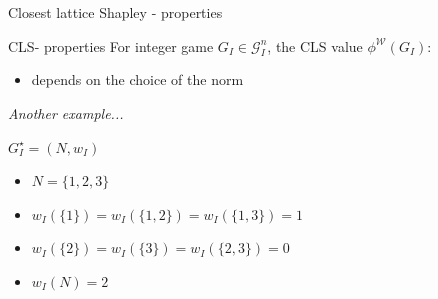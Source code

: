 \documentclass{beamer}
\begin{document}


\begin{frame}{Closest lattice Shapley - properties}
    \pause

    \begin{block}{CLS- properties}
        For integer game $G_I \in \mathcal{G}_I^n$, the CLS value $\phi^\mathcal{W}(G_I)$:
        \begin{itemize}
            \item depends on the choice of the norm
        \end{itemize}
    \end{block}

    \pause

    \textit{Another example...}

    \pause

    \begin{block}{$G_I^{\star}=(N,w_I)$}
        \begin{itemize}
            \pause
            \item $N=\{1,2,3\}$
            \pause
            \item $w_I(\{1\})=w_I(\{1,2\})=w_I(\{1,3\})=1$
            \pause
            \item $w_I(\{2\})=w_I(\{3\})=w_I(\{2,3\})=0$
            \pause
            \item $w_I(N)=2$
        \end{itemize}
    \end{block}
\end{frame}


\end{document}
